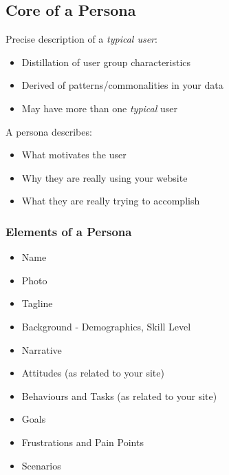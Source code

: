 \subsection{Core of a Persona}
Precise description of a \textit{typical user}:
\begin{itemize}
	\item Distillation of user group characteristics
	\item Derived of patterns/commonalities in your data
	\item May have more than one \textit{typical} user	
\end{itemize}
A persona describes:
\begin{itemize}
	\item What motivates the user
	\item Why they are really using your website
	\item What they are really trying to accomplish	
\end{itemize}

\subsubsection{Elements of a Persona}
\begin{itemize}
	\item Name
	\item Photo
	\item Tagline
	\item Background - Demographics, Skill Level
	\item Narrative
	\item Attitudes (as related to your site)
	\item Behaviours and Tasks (as related to your site)
	\item Goals
	\item Frustrations and Pain Points
	\item Scenarios	
\end{itemize}


